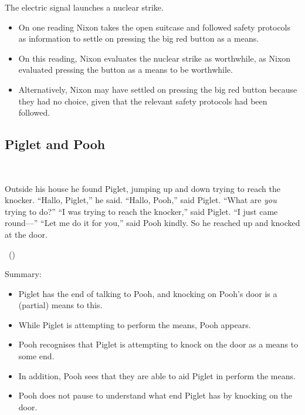 \documentclass[10pt]{article}
\newcommand{\hozlinedash}[0]{%
  \noindent\hdashrule[0.5ex][c]{\textwidth}{.1pt}{2.5pt}
}
\begin{document}
The electric signal launches a nuclear strike.

\hozlinedash

\begin{itemize}[noitemsep]
\item On one reading Nixon takes the open suitcase and followed safety protocols as information to settle on pressing the big red button as a means.
\item On this reading, Nixon evaluates the nuclear strike as worthwhile, as Nixon evaluated pressing the button as a means to be worthwhile.
\item Alternatively, Nixon may have settled on pressing the big red button because they had no choice, given that the relevant safety protocols had been followed.
\end{itemize}

\subsection{Piglet and Pooh}
\label{sec:piglet-pooh}


\begin{scenario}\mbox{ }

  \noindent Outside his house he found Piglet, jumping up and down trying to reach the knocker.\newline
  ``Hallo, Piglet,'' he said.\newline
  ``Hallo, Pooh,'' said Piglet.\newline
  ``What are \emph{you} trying to do?''\newline
  ``I was trying to reach the knocker,'' said Piglet.
  ``I just came round---''\newline
  ``Let me do it for you,'' said Pooh kindly.
  So he reached up and knocked at the door.

  \mbox{ }\hfill\mbox{(\cite[77--78]{Milne:2009aa})}
\end{scenario}

\begin{center}
\end{center}

\hozlinedash

Summary:
\begin{itemize}[noitemsep]
\item Piglet has the end of talking to Pooh, and knocking on Pooh's door is a (partial) means to this.
\item While Piglet is attempting to perform the means, Pooh appears.
\item Pooh recognises that Piglet is attempting to knock on the door as a means to some end.
\item In addition, Pooh sees that they are able to aid Piglet in perform the means.
\item Pooh does not pause to understand what end Piglet has by knocking on the door.
\end{itemize}
\end{document}
